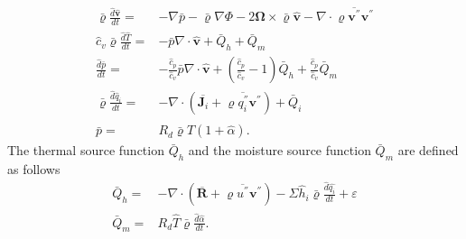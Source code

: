 \begin{align}
\bar{\varrho}\frac{\hat{d}\hat{\mathbf{v}}}{dt}=&-\nabla\bar{p}-
\bar{\varrho}\nabla\Phi -2\mathbf{\Omega}\times\bar{\varrho}\hat{\mathbf{v}}-\nabla\cdot \overline{\varrho \mathbf{v}^{''}\mathbf{v}^{''}}
\label{equ24}\\
\hat{c}_v \bar{\varrho}\frac{\hat{d}\hat{T}}{dt}=&-\bar{p} \nabla\cdot \hat{\mathbf{v}} + \bar{Q}_h + \bar{Q}_m \label{equ25}\\
\frac{\hat{d}\bar{p}}{dt}=&-\frac{\hat{c}_p }{\hat{c}_v }\bar{p} \nabla\cdot \hat{\mathbf{v}}+\left( \frac{\hat{c}_p}{\hat{c}_v } - 1 \right)  \bar{Q}_h  +\frac{\hat{c}_p}{\hat{c}_v }\bar{Q}_m \label{equ26}\\
\bar{\varrho}\frac{\hat{d}\hat{q}_{i}}{dt}=&-\nabla\cdot( \overline{\mathbf{J}_i} + \overline{\varrho q_{i}^{''}\mathbf{v}^{''}}) + \bar{Q}_i  \label{equ27}\\
\bar{p}=& R_d \bar{\varrho}\hat{T}( 1 + \hat{\alpha}).\label{equ28}
\end{align} 
The thermal source function $\bar{Q}_h$ and the moisture source function $\bar{Q}_m$ are defined as follows
\begin{align}
\bar{Q}_h =& - \nabla \cdot ( \overline{\mathbf{R}}+\overline{\varrho u^{''}\mathbf{v}^{''}}) - \Sigma{\hat{h}_i} \bar{\varrho} \frac{\hat{d}\hat{q_i}}{d t} + \varepsilon \label{equ29}\\
\bar{Q}_m =& R_d\hat{T} \bar{\varrho} \frac{\hat{d}\hat{\alpha}}{d t} .\label{equ30}
\end{align}

